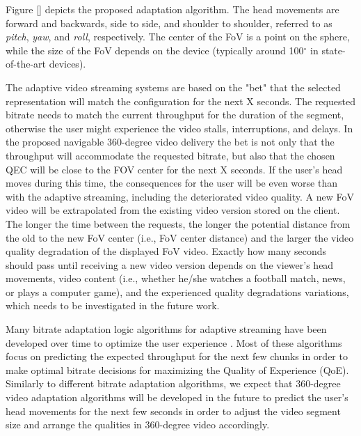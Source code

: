 Figure \ref{} depicts the proposed adaptation algorithm. The head movements are forward and backwards, side to side, and shoulder to shoulder, referred to as \emph{pitch}, \emph{yaw}, and \emph{roll}, respectively. The center of the \ac{FoV} is a point on the sphere, while the size of the FoV depends on the device (typically around 100$^\circ$ in state-of-the-art devices).

The adaptive video streaming systems are based on the "bet" that the selected representation will match the configuration for the next X seconds. The requested bitrate needs to match the current throughput for the duration of the segment, otherwise the user might experience the video stalls, interruptions, and delays. In the proposed navigable 360-degree video delivery the bet is not only that the throughput will accommodate the requested bitrate, but also that the chosen QEC will be close to the FOV center for the next X seconds. If the user's head moves during this time, the consequences for the user will be even worse than with the adaptive streaming, including the deteriorated video quality. A new FoV video will be extrapolated from the existing video version stored on the client. The longer the time between the requests, the longer the potential distance from the old to the new FoV center (i.e., FoV center distance) and the larger the video quality degradation of the displayed FoV video. Exactly how many seconds should pass until receiving a new video version depends on the viewer's head movements, video content (i.e., whether he/she watches a football match, news, or plays a computer game), and the experienced quality degradations variations, which needs to be investigated in the future work.

Many bitrate adaptation logic algorithms for adaptive streaming have been developed over time to optimize the user experience \cite{}. Most of these algorithms focus on predicting the expected throughput for the next few chunks in order to make optimal bitrate decisions for maximizing the Quality of Experience (QoE). Similarly to different bitrate adaptation algorithms, we expect that 360-degree video adaptation algorithms will be developed in the future to predict the user's head movements for the next few seconds in order to adjust the video segment size and arrange the qualities in 360-degree video accordingly. %


